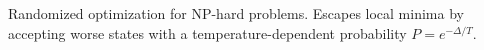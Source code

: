 
Randomized optimization for NP-hard problems. Escapes local minima by accepting worse states with a temperature-dependent probability $P = e^{-\Delta / T}$.


